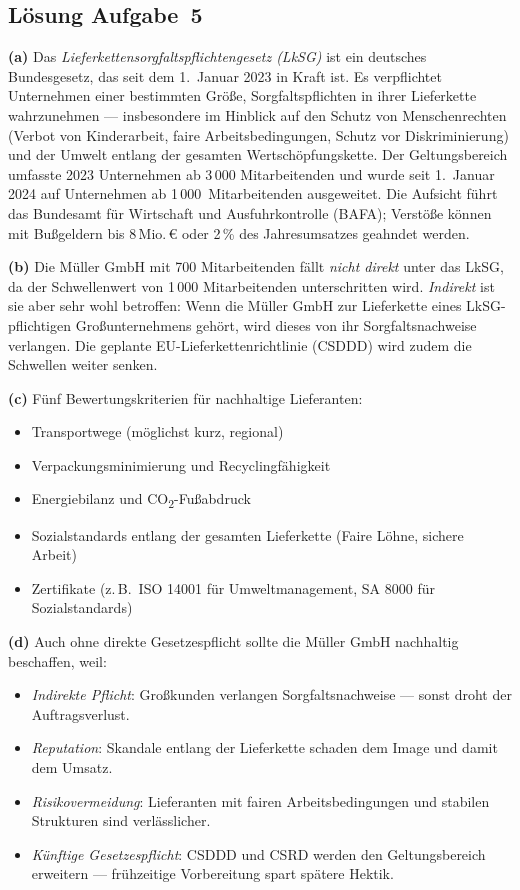 \documentclass[11pt, a4paper]{article}
\begin{document}
\subsection*{Lösung Aufgabe~5}
\begin{loesung}
\textbf{(a)} Das \emph{Lieferketten\-sorgfalts\-pflichten\-gesetz (LkSG)} ist ein deutsches
Bundes\-gesetz, das seit dem 1.~Januar 2023 in Kraft ist. Es verpflichtet Unternehmen
einer bestimmten Größe, Sorgfalts\-pflichten in ihrer Lieferkette wahrzunehmen ---
insbesondere im Hinblick auf den Schutz von Menschenrechten (Verbot von Kinderarbeit,
faire Arbeits\-bedingungen, Schutz vor Diskriminierung) und der Umwelt entlang der
gesamten Wert\-schöpfungs\-kette. Der Geltungsbereich umfasste 2023 Unternehmen ab
3\,000 Mitarbeitenden und wurde seit 1.~Januar 2024 auf Unternehmen ab 1\,000~Mit\-arbeitenden
ausgeweitet. Die Aufsicht führt das Bundesamt für Wirtschaft und Ausfuhrkontrolle (BAFA);
Verstöße können mit Bußgeldern bis 8\,Mio.\,€ oder 2\,\% des Jahres\-umsatzes geahndet werden.

\textbf{(b)} Die Müller GmbH mit 700 Mitarbeitenden fällt \emph{nicht direkt} unter das
LkSG, da der Schwellenwert von 1\,000 Mitarbeitenden unterschritten wird. \emph{Indirekt}
ist sie aber sehr wohl betroffen: Wenn die Müller GmbH zur Lieferkette eines LkSG-pflichtigen
Großunternehmens gehört, wird dieses von ihr Sorgfalts\-nachweise verlangen. Die
geplante EU-Lieferketten\-richtlinie (CSDDD) wird zudem die Schwellen weiter senken.

\textbf{(c)} Fünf Bewertungs\-kriterien für nachhaltige Lieferanten:
\begin{itemize}[itemsep=0pt]
  \item Transport\-wege (möglichst kurz, regional)
  \item Verpackungs\-minimierung und Recyclingfähigkeit
  \item Energie\-bilanz und CO\textsubscript{2}-Fußabdruck
  \item Sozialstandards entlang der gesamten Lieferkette (Faire Löhne, sichere Arbeit)
  \item Zertifikate (z.\,B.\ ISO 14001 für Umweltmanagement, SA 8000 für Sozial\-standards)
\end{itemize}

\textbf{(d)} Auch ohne direkte Gesetzespflicht sollte die Müller GmbH nachhaltig
beschaffen, weil:
\begin{itemize}[itemsep=0pt]
  \item \emph{Indirekte Pflicht}: Großkunden verlangen Sorgfalts\-nachweise --- sonst droht der Auftrags\-verlust.
  \item \emph{Reputation}: Skandale entlang der Lieferkette schaden dem Image und damit dem Umsatz.
  \item \emph{Risiko\-vermeidung}: Lieferanten mit fairen Arbeits\-bedingungen und stabilen Strukturen sind verlässlicher.
  \item \emph{Künftige Gesetzes\-pflicht}: CSDDD und CSRD werden den Geltungsbereich erweitern --- frühzeitige Vorbereitung spart spätere Hektik.
\end{itemize}
\end{loesung}
\end{document}
